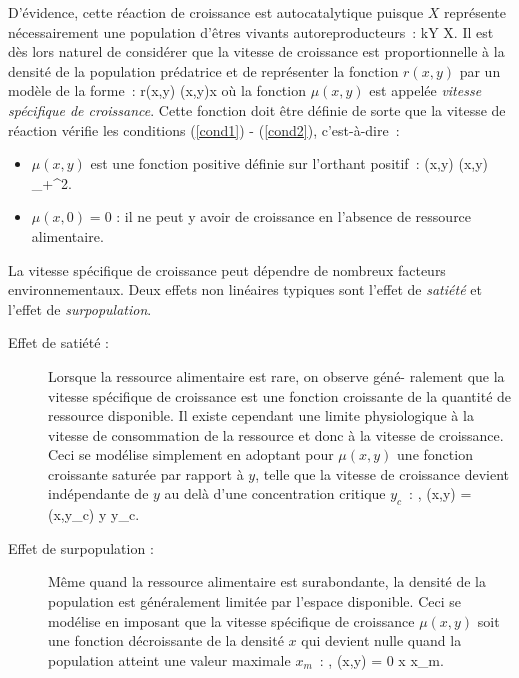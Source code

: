 D'évidence, cette réaction de croissance est autocatalytique puisque $X$
représente nécessairement une population d'êtres vivants autoreproducteurs~: 
\eqnn
kY  X.
\eeqnn
Il est dès lors naturel de considérer que la vitesse de croissance est
proportionnelle à la densité de la population prédatrice et de représenter
la fonction $r(x,y)$ par un modèle de la forme~:
\eqnn
r(x,y) \teq \mu(x,y)x
\eeqnn
où la fonction $\mu(x,y)$ est appelée {\em vitesse spécifique de
croissance}. Cette fonction doit être définie de sorte que la vitesse de
réaction vérifie les conditions (\ref{cond1}) - (\ref{cond2}), c'est-à-dire~:
\begin{itemize}
\item $\mu(x,y)$ est une fonction positive définie sur l'orthant positif~:
\eqnn
\mu(x,y)  \hh \hh \forall (x,y) \in {}_{+}^{2}.
\eeqnn
\item $\mu(x,0) = 0$ : il ne peut y avoir de croissance en l'absence de
ressource alimentaire.
\end{itemize}
La vitesse spécifique de croissance peut dépendre de nombreux facteurs
environnementaux. Deux effets non linéaires typiques sont l'effet de
{\em satiété} et l'effet de {\em surpopulation}.
\begin{description}
\item[Effet de satiété :] Lorsque la ressource alimentaire est rare, on
observe géné- ralement que la vitesse spécifique de croissance est une
fonction croissante de la quantité de ressource disponible. Il existe
cependant une limite physiologique à la vitesse de consommation
de la ressource et donc à la vitesse de croissance. Ceci se
modélise simplement en adoptant pour $\mu(x,y)$ une fonction
croissante saturée par rapport à $y$, telle que la vitesse de croissance
devient indépendante de $y$ au delà d'une concentration critique
$y_{c}$~: 
\eqnn
{} , \hspace{1cm}
\mu(x,y) = \mu(x,y_{c}) \hh \hh \forall \hh y \geq y_{c}.
\eeqnn
\item[Effet de surpopulation :] Même quand la ressource alimentaire est
surabondante, la densité de la population est généralement limitée par
l'espace disponible. Ceci se modélise en imposant que la vitesse spécifique de
croissance $\mu(x,y)$ soit une fonction décroissante de la densité $x$
qui devient nulle quand la population atteint une valeur maximale $x_{m}$~:
 \eqnn
{} , \hspace{1cm}
\mu(x,y) = 0 \hh \hh \forall \hh x \geq x_{m}.
\eeqnn
\end{description}

